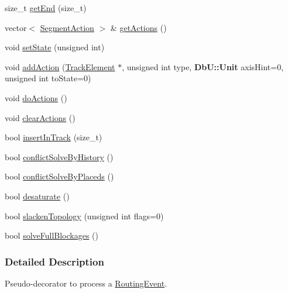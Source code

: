 \begin{DoxyCompactItemize}
\item 
size\-\_\-t \hyperlink{classKite_1_1SegmentFsm_aaf31c0a3018908a2ee26a8ea9e893eb1}{get\-End} (size\-\_\-t)
\item 
vector$<$ \hyperlink{classKite_1_1SegmentAction}{Segment\-Action} $>$ \& \hyperlink{classKite_1_1SegmentFsm_ab3b06bb353ee9333be6b937bffc8fd84}{get\-Actions} ()
\item 
void \hyperlink{classKite_1_1SegmentFsm_adf5147448951f8dc8b4088a1032e97b2}{set\-State} (unsigned int)
\item 
void \hyperlink{classKite_1_1SegmentFsm_ad9384c1cc2a9cd70ab9ff089b56380a0}{add\-Action} (\hyperlink{classKite_1_1TrackElement}{Track\-Element} $\ast$, unsigned int type, {\bf Db\-U\-::\-Unit} axis\-Hint=0, unsigned int to\-State=0)
\item 
void \hyperlink{classKite_1_1SegmentFsm_abbcf429498049478d4d8ab94cdb4a022}{do\-Actions} ()
\item 
void \hyperlink{classKite_1_1SegmentFsm_a4cf911f1f4e5ac588d502c9d069a1bde}{clear\-Actions} ()
\item 
bool \hyperlink{classKite_1_1SegmentFsm_a7140b507da2cab137d968a037bed19df}{insert\-In\-Track} (size\-\_\-t)
\item 
bool \hyperlink{classKite_1_1SegmentFsm_a0d9a9926ae67cc7998799347f135e28a}{conflict\-Solve\-By\-History} ()
\item 
bool \hyperlink{classKite_1_1SegmentFsm_a9c0fa6a9067b6e027e24f38330f627dc}{conflict\-Solve\-By\-Placeds} ()
\item 
bool \hyperlink{classKite_1_1SegmentFsm_a0b8e8be9d7c9501be9534d3c2a9dd586}{desaturate} ()
\item 
bool \hyperlink{classKite_1_1SegmentFsm_a623d68f599c0de60cdd36af3f183e6f1}{slacken\-Topology} (unsigned int flags=0)
\item 
bool \hyperlink{classKite_1_1SegmentFsm_ab8ae818baad1d0a274a7e8c308ca3f92}{solve\-Full\-Blockages} ()
\end{DoxyCompactItemize}


\subsubsection{Detailed Description}
Pseudo-\/decorator to process a \hyperlink{classKite_1_1RoutingEvent}{Routing\-Event}. 

